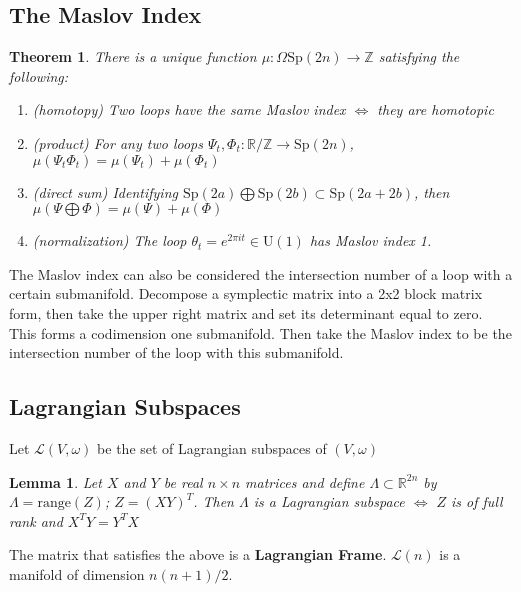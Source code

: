 \documentclass{article}
\newtheorem{thm}{Theorem}
\newtheorem{lem}{Lemma}
\begin{document}
\subsection{The Maslov Index}

\begin{thm}

There is a unique function $\mu: \Omega \mathrm{Sp}(2n) \to \mathbb{Z}$ satisfying the following: 
\begin{enumerate}
    \item (homotopy) Two loops have the same Maslov index $\iff$ they are homotopic
    \item (product) For any two loops $\Psi_t, \Phi_t: \mathbb{R/Z} \to \mathrm{Sp}(2n)$, $\mu(\Psi_t \Phi_t) = \mu(\Psi_t) + \mu(\Phi_t)$
    \item (direct sum) Identifying $ \mathrm{Sp}(2a) \bigoplus \mathrm{Sp}(2b) \subset \mathrm{Sp}(2a+2b)$, then $\mu(\Psi \bigoplus \Phi) = \mu(\Psi) + \mu (\Phi) $
    \item (normalization) The loop $\theta_t = e^{2 \pi i t} \in \mathrm{U}(1)$ has Maslov index 1.
\end{enumerate}

\end{thm}

The Maslov index can also be considered the intersection number of a loop with a certain submanifold. Decompose a symplectic matrix into a 2x2 block matrix form, then take the upper right matrix and set its determinant equal to zero. This forms a codimension one submanifold. Then take the Maslov index to be the intersection number of the loop with this submanifold.

\subsection{Lagrangian Subspaces}

Let $\mathcal{L}(V,\omega)$ be the set of Lagrangian subspaces of $(V,\omega)$

\begin{lem}

Let $X$ and $Y$ be real $n \times n$ matrices and define $\Lambda \subset \mathbb{R}^{2n} $ by $\Lambda = \mathrm{range}(Z)$; $Z = (X Y)^{T}$. Then $\Lambda$ is a Lagrangian subspace $\iff$ $Z$ is of full rank and $X^T Y = Y^T X$

\end{lem}

The matrix that satisfies the above is a \textbf{Lagrangian Frame}. $\mathcal{L}(n)$ is a manifold of dimension $n(n+1)/2$.
\end{document}
